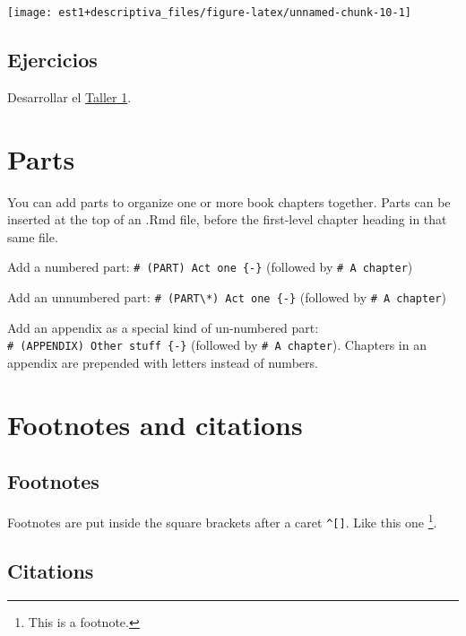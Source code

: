\documentclass[
]{book}
\theoremstyle{definition}
\theoremstyle{definition}
\theoremstyle{definition}
\theoremstyle{definition}
\theoremstyle{remark}
\begin{document}
\begin{center}\texttt{[image: est1+descriptiva\_files/figure-latex/unnamed-chunk-10-1]} \end{center}

\hypertarget{ejercicios}{%
\section{Ejercicios}\label{ejercicios}}

Desarrollar el \href{https://colab.research.google.com/drive/1wASaDklH5qgHqfCPdri-V2cg00KflJBf?usp=sharing}{Taller 1}.

\hypertarget{parts}{%
\chapter{Parts}\label{parts}}

You can add parts to organize one or more book chapters together. Parts can be inserted at the top of an .Rmd file, before the first-level chapter heading in that same file.

Add a numbered part: \texttt{\#\ (PART)\ Act\ one\ \{-\}} (followed by \texttt{\#\ A\ chapter})

Add an unnumbered part: \texttt{\#\ (PART\textbackslash{}*)\ Act\ one\ \{-\}} (followed by \texttt{\#\ A\ chapter})

Add an appendix as a special kind of un-numbered part: \texttt{\#\ (APPENDIX)\ Other\ stuff\ \{-\}} (followed by \texttt{\#\ A\ chapter}). Chapters in an appendix are prepended with letters instead of numbers.

\hypertarget{footnotes-and-citations}{%
\chapter{Footnotes and citations}\label{footnotes-and-citations}}

\hypertarget{footnotes}{%
\section{Footnotes}\label{footnotes}}

Footnotes are put inside the square brackets after a caret \texttt{\^{}{[}{]}}. Like this one \footnote{This is a footnote.}.

\hypertarget{citations}{%
\section{Citations}\label{citations}}
\end{document}
